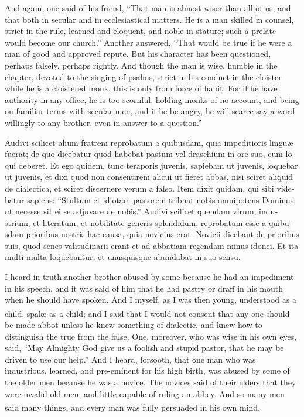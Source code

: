 \documentclass{book}
\newcounter{engnote}
\newcommand{\engnotenum}{\textsuperscript{\arabic{engnote}\stepcounter{engnote}}}
\newcommand{\engnotetext}[1]{\vphantom{\footnotemark{}}\footnotetext{#1}}
\begin{document}
\begin{paracol}{2}
\switchcolumn

And again, one said of his friend, ``That man is almost wiser than all of us, and that both in secular and in ecclesiastical matters. He is a man skilled in counsel, strict in the rule, learned and eloquent, and noble in stature; such a prelate would become our church.'' Another answered, ``That would be true if he were a man of good and approved repute. But his character has been questioned, perhaps falsely, perhaps rightly. And though the man is wise, humble in the chapter, devoted to the singing of psalms, strict in his conduct in the cloister while he is a cloistered monk, this is only from force of habit. For if he have authority in any office, he is too scornful, holding monks of no account, and being on familiar terms with secular men, and if he be angry, he will scarce say a word willingly to any brother, even in answer to a question.''

\switchcolumn*

\begin{otherlanguage}{latin}
Audivi scilicet alium fratrem reprobatum a quibusdam, quia impeditioris lingu\ae{} fuerat; de quo dicebatur quod habebat pastum vel draschium in ore suo, cum loqui deberet. Et ego quidem, tunc teraporis juvenis,\engnotetext{I.\ Cor.\ xiii., \oldstylenums{11}.} sapiebam ut juvenis, loquebar ut juvenis, et dixi quod non consentirem alicui ut fieret abbas, nisi sciret aliquid de dialectica, et sciret discernere verum a falso. Item dixit quidam, qui sibi videbatur sapiens: ``Stultum et idiotam pastorem tribuat nobis omnipotens Dominus, ut necesse sit ei se adjuvare de nobis.'' Audivi scilicet quendam virum, industrium, et literatum, et nobilitate generis splendidum, reprobatum esse a quibusdam prioribus nostris hac causa, quia novicius erat. Novicii dicebant de prioribus suis, quod senes valitudinarii erant et ad abbatiam regendam minus idonei. Et ita multi multa loquebantur, et unusquisque abundabat in suo sensu.\engnotetext{Rom.\ xiv., \oldstylenums{5}.}
\end{otherlanguage}

\switchcolumn

I heard in truth another brother abused by some because he had an impediment in his speech, and it was said of him that he had pastry or draff in his mouth when he should have spoken. And I myself, as I was then young, understood as a child,\engnotenum{} spake as a child; and I said that I would not consent that any one should be made abbot unless he knew something of dialectic, and knew how to distinguish the true from the false. One, moreover, who was wise in his own eyes, said, ``May Almighty God give us a foolish and stupid pastor, that he may be driven to use our help.'' And I heard, forsooth, that one man who was industrious, learned, and pre-eminent for his high birth, was abused by some of the older men because he was a novice. The novices said of their elders that they were invalid old men, and little capable of ruling an abbey. And so many men said many things, and every man was fully persuaded in his own mind.\engnotenum{}


\end{paracol}
\end{document}
